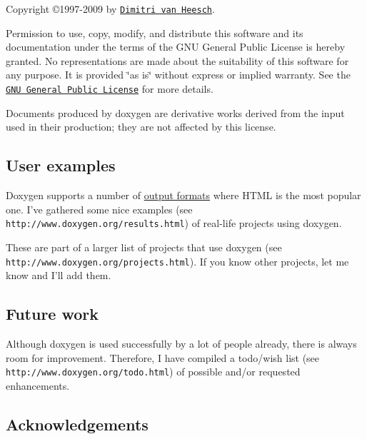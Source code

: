  

Copyright \copyright 1997-\/2009 by \href{mailto:dimitri@stack.nl}{\tt Dimitri van Heesch}.

Permission to use, copy, modify, and distribute this software and its documentation under the terms of the GNU General Public License is hereby granted. No representations are made about the suitability of this software for any purpose. It is provided \char`\"{}as is\char`\"{} without express or implied warranty. See the \href{http://www.gnu.org/licenses/old-licenses/gpl-2.0.html}{\tt GNU General Public License} for more details. 

Documents produced by doxygen are derivative works derived from the input used in their production; they are not affected by this license.

\subsection*{User examples}

Doxygen supports a number of \hyperlink{output}{output formats} where HTML is the most popular one. I've gathered   
some nice examples (see {\tt http://www.doxygen.org/results.html})
 of real-\/life projects using doxygen.

These are part of a larger   
list of projects that use doxygen (see {\tt http://www.doxygen.org/projects.html}).
 If you know other projects, let me know and I'll add them.

\subsection*{Future work}

Although doxygen is used successfully by a lot of people already, there is always room for improvement. Therefore, I have compiled a   
todo/wish list (see {\tt http://www.doxygen.org/todo.html})
 of possible and/or requested enhancements.

\subsection*{Acknowledgements}

